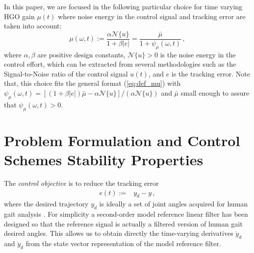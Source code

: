 \documentclass[letterpaper, 10 pt, conference]{ieeeconf}  %
\theoremstyle{plain}
\theoremstyle{definition}
\theoremstyle{remark}
\begin{document}
In this paper, we are focused in the following particular choice for time varying HGO gain $\mu(t)$ where noise energy in the control signal and tracking error are taken into account: 
%
\begin{equation}
\mu(\omega,t):=\frac{\alpha \mathcal{N}\{u\}}{1+\beta |e|}=\frac{\bar{\mu}}{1+
\psi_\mu(\omega,t)}\,,\label{eq:def_mupratico}
\end{equation}
%
where $\alpha,\beta$ are positive design constants, $\mathcal{N}\{u\}>0$ is the noise energy in the control effort, which can be extracted from several  methodologies  such as the Signal-to-Noise ratio of the control signal $u(t)$, and $e$ is the tracking error. Note that, this choice fits the general format (\ref{eq:def_mu}) with $\psi_\mu(\omega,t)=[(1+\beta |e|) \bar{\mu}-\alpha \mathcal{N}\{u\}]/(\alpha \mathcal{N}\{u\})$ and $\bar{\mu}$ small enough to assure that  $\psi_\mu(\omega,t)>0$. 


\section{Problem Formulation and Control Schemes Stability Properties}

The {\em control objective} is to reduce the tracking error 
%
\begin{align}
e(t) := & y_{d} - y\,,
\end{align}
%
where the desired trajectory $y_d$ is ideally a set of joint angles acquired for human gait analysis \cite{Schwartz2008}. For simplicity a second-order model reference linear filter%
%
%
has been designed so that the reference signal is actually a filtered version of human gait desired angles. This allows us to obtain directly the  time-varying derivatives $\dot{y}_d$ and $\ddot{y}_d$ from the state vector representation of the model reference filter.
\end{document}
